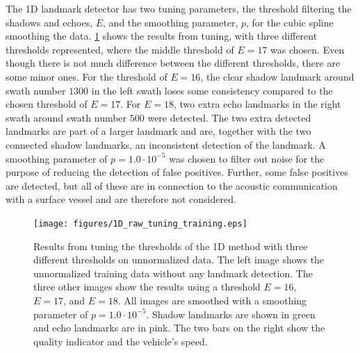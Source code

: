 The 1D landmark detector has two tuning parameters, the threshold filtering the shadows and echoes, $E$, and the smoothing parameter, $p$, for the cubic spline smoothing the data. \cref{fig:1D_raw_tuning_training} shows the results from tuning, with three different thresholds represented, where the middle threshold of $E = 17$ was chosen. Even though there is not much difference between the different thresholds, there are some minor ones. For the threshold of $E = 16$, the clear shadow landmark around swath number $1300$ in the left swath loses some consistency compared to the chosen threshold of $E = 17$. For $E = 18$, two extra echo landmarks in the right swath around swath number $500$ were detected. The two extra detected landmarks are part of a larger landmark and are, together with the two connected shadow landmarks, an inconsistent detection of the landmark. A smoothing parameter of $p = 1.0 \cdot 10^{-5}$ was chosen to filter out noise for the purpose of reducing the detection of false positives. Further, some false positives are detected, but all of these are in connection to the acoustic communication with a surface vessel and are therefore not considered. 

\begin{figure}   %
  \centering
  \texttt{[image: figures/1D\_raw\_tuning\_training.eps]}
  \caption[Results of tuning threshold of the 1D method]{Results from tuning the thresholds of the 1D method with three different thresholds on unnormalized data. The left image shows the unnormalized training data without any landmark detection. The three other images show the results using a threshold $E = 16$, $E = 17$, and $E = 18$. All images are smoothed with a smoothing parameter of $p = 1.0 \cdot 10^{-5}$. Shadow landmarks are shown in green and echo landmarks are in pink. The two bars on the right show the quality indicator and the vehicle's speed.}
  \label{fig:1D_raw_tuning_training}
\end{figure}

